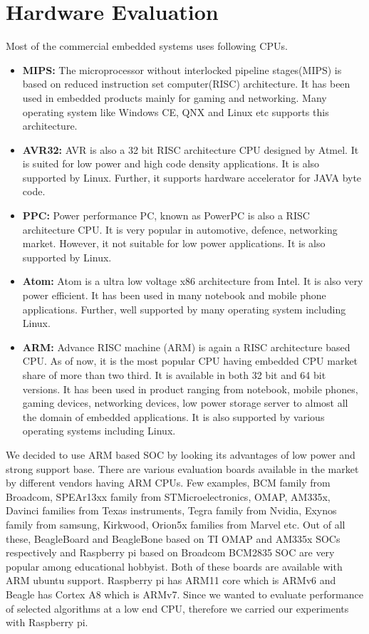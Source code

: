 \section {Hardware Evaluation}
\indent Most of the commercial embedded systems uses following CPUs.
\begin{itemize}
	\item \textbf{MIPS:} The microprocessor without interlocked
		pipeline stages(MIPS) is based on reduced instruction
		set computer(RISC) architecture. It has been used in
		embedded products mainly for gaming and networking. Many
		operating system like Windows CE, QNX and Linux etc
		supports this architecture.
	\item \textbf{AVR32:} AVR is also a 32 bit RISC architecture CPU
		designed by Atmel. It is suited for low power and high
		code density applications.  It is also supported by
		Linux. Further, it supports hardware accelerator for
		JAVA byte code.
	\item \textbf{PPC:} Power performance PC, known as PowerPC is
		also a RISC architecture CPU. It is very popular in
		automotive, defence, networking market. However, it not
		suitable for low power applications. It is also
		supported by Linux.
	\item \textbf{Atom:} Atom is a ultra low voltage x86
		architecture from Intel. It is also very power
		efficient. It has been used in many notebook and mobile
		phone applications. Further, well supported by many
		operating system including Linux.
	\item \textbf{ARM:} Advance RISC machine (ARM) is again a RISC
		architecture based CPU. As of now, it is the most
		popular CPU having embedded CPU market share of more
		than two third. It is available in both 32 bit and 64
		bit versions. It has been used in product ranging from
		notebook, mobile phones, gaming devices, networking
		devices, low power storage server to almost all the
		domain of embedded applications. It is also supported by
		various operating systems including Linux.
\end{itemize}
We decided to use ARM based SOC by looking its advantages of low power
and strong support base. There are various evaluation boards available
in the market by different vendors having ARM CPUs. Few examples, BCM
family from Broadcom, SPEAr13xx family from STMicroelectronics, OMAP,
AM335x, Davinci families from Texas instruments, Tegra family from
Nvidia, Exynos family from samsung, Kirkwood, Orion5x families from
Marvel etc. Out of all these, BeagleBoard and BeagleBone based on TI
OMAP and AM335x SOCs respectively and Raspberry pi based on Broadcom
BCM2835 SOC are very popular among educational hobbyist. Both of these
boards are available with ARM ubuntu support. Raspberry pi has ARM11
core which is ARMv6 and Beagle has Cortex A8 which is ARMv7. Since we
wanted to evaluate performance of selected algorithms at a low end CPU,
therefore we carried our experiments with Raspberry pi.
